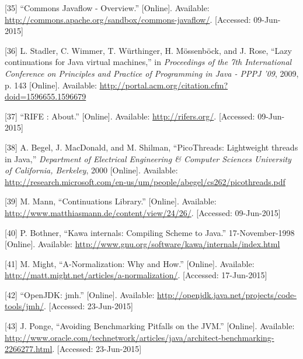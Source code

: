 \documentclass[12pt,a4paper,oneside,openright]{book}
\begin{document}
{
{[}35{]} ``Commons Javaflow - Overview.'' {[}Online{]}. Available:
\url{http://commons.apache.org/sandbox/commons-javaflow/}. {[}Accessed:
09-Jun-2015{]}

{[}36{]} L. Stadler, C. Wimmer, T. Würthinger, H. Mössenböck, and J.
Rose, ``Lazy continuations for Java virtual machines,'' in
\emph{Proceedings of the 7th International Conference on Principles and
Practice of Programming in Java - PPPJ '09}, 2009, p. 143 {[}Online{]}.
Available: \url{http://portal.acm.org/citation.cfm?doid=1596655.1596679}

{[}37{]} ``RIFE : About.'' {[}Online{]}. Available:
\url{http://rifers.org/}. {[}Accessed: 09-Jun-2015{]}

{[}38{]} A. Begel, J. MacDonald, and M. Shilman, ``PicoThreads:
Lightweight threads in Java,'' \emph{Department of Electrical
Engineering \& Computer Sciences University of California, Berkeley},
2000 {[}Online{]}. Available:
\url{http://research.microsoft.com/en-us/um/people/abegel/cs262/picothreads.pdf}

{[}39{]} M. Mann, ``Continuations Library.'' {[}Online{]}. Available:
\url{http://www.matthiasmann.de/content/view/24/26/}. {[}Accessed:
09-Jun-2015{]}

{[}40{]} P. Bothner, ``Kawa internals: Compiling Scheme to Java.''
17-November-1998 {[}Online{]}. Available:
\url{http://www.gnu.org/software/kawa/internals/index.html}

{[}41{]} M. Might, ``A-Normalization: Why and How.'' {[}Online{]}.
Available: \url{http://matt.might.net/articles/a-normalization/}.
{[}Accessed: 17-Jun-2015{]}

{[}42{]} ``OpenJDK: jmh.'' {[}Online{]}. Available:
\url{http://openjdk.java.net/projects/code-tools/jmh/}. {[}Accessed:
23-Jun-2015{]}

{[}43{]} J. Ponge, ``Avoiding Benchmarking Pitfalls on the JVM.''
{[}Online{]}. Available:
\url{http://www.oracle.com/technetwork/articles/java/architect-benchmarking-2266277.html}.
{[}Accessed: 23-Jun-2015{]}

}
\end{document}

